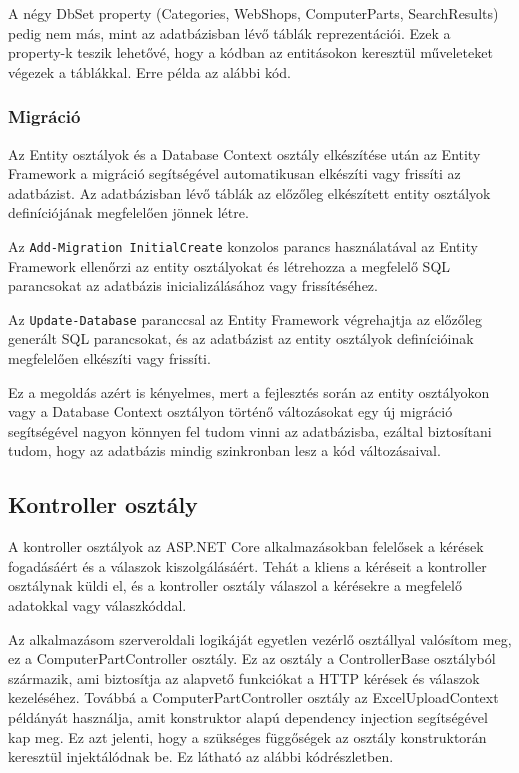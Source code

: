 \documentclass[
]{thesis-ekf}
\theoremstyle{definition}
\theoremstyle{remark}
\begin{document}
A négy DbSet property (Categories, WebShops, ComputerParts, SearchResults) pedig nem más, mint az adatbázisban lévő táblák reprezentációi. Ezek a property-k teszik lehetővé, hogy a kódban az entitásokon keresztül műveleteket végezek a táblákkal. Erre példa az alábbi kód.



\subsubsection{Migráció}
Az Entity osztályok és a Database Context osztály elkészítése után az Entity Framework a migráció segítségével automatikusan elkészíti vagy frissíti az adatbázist. Az adatbázisban lévő táblák az előzőleg elkészített entity osztályok definíciójának megfelelően jönnek létre.

Az \texttt{Add-Migration InitialCreate} konzolos parancs használatával az Entity Framework ellenőrzi az entity osztályokat és létrehozza a megfelelő SQL parancsokat az adatbázis inicializálásához vagy frissítéséhez.

Az \texttt{Update-Database} paranccsal az Entity Framework végrehajtja az előzőleg generált SQL parancsokat, és az adatbázist az entity osztályok definícióinak megfelelően elkészíti vagy frissíti.

Ez a megoldás azért is kényelmes, mert a fejlesztés során az entity osztályokon vagy a Database Context osztályon történő változásokat egy új migráció segítségével nagyon könnyen fel tudom vinni az adatbázisba, ezáltal biztosítani tudom, hogy az adatbázis mindig szinkronban lesz a kód változásaival.	
\subsection{Kontroller osztály}
A kontroller osztályok az ASP.NET Core alkalmazásokban felelősek a kérések fogadásáért és a válaszok kiszolgálásáért. Tehát a kliens a kéréseit a kontroller osztálynak küldi el, és a kontroller osztály válaszol a kérésekre a megfelelő adatokkal vagy válaszkóddal.

Az alkalmazásom szerveroldali logikáját egyetlen vezérlő osztállyal valósítom meg, ez a ComputerPartController osztály. Ez az osztály a ControllerBase osztályból származik, ami biztosítja az alapvető funkciókat a HTTP kérések és válaszok kezeléséhez. Továbbá a ComputerPartController osztály az ExcelUploadContext példányát használja, amit konstruktor alapú dependency injection segítségével kap meg. Ez azt jelenti, hogy a szükséges függőségek az osztály konstruktorán keresztül injektálódnak be. Ez látható az alábbi kódrészletben.

\end{document}
